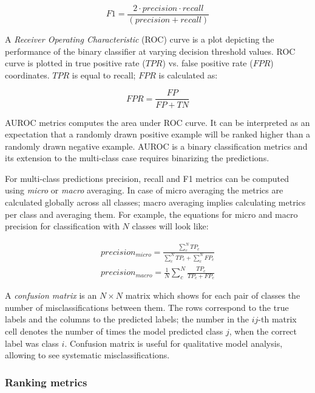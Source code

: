 \begin{equation}
    F1 = \frac{2 \cdot precision \cdot recall}{(precision + recall)}
\end{equation}

 A \textit{Receiver Operating Characteristic} (ROC) curve is a plot depicting the performance of the binary classifier at varying decision threshold values. ROC curve is plotted in true positive rate ($TPR$) vs. false positive rate ($FPR$) coordinates. $TPR$ is equal to recall; $FPR$ is calculated as:

\begin{equation}
    FPR = \frac{FP}{FP + TN}
\end{equation}

AUROC metrics computes the area under ROC curve. It can be interpreted as an expectation that a randomly drawn positive example will be ranked higher than a randomly drawn negative example. AUROC is a binary classification metrics and its extension to the multi-class case requires binarizing the predictions.

 For multi-class predictions precision, recall and F1 metrics can be computed using \textit{micro} or \textit{macro} averaging. In case of micro averaging the metrics are calculated globally across all classes; macro averaging implies calculating metrics per class and averaging them. For example, the equations for micro and macro precision for classification with $N$ classes will look like:

\begin{align}
    precision_{micro} = \frac{\sum_{c}^N TP_c}{\sum_{c}^N TP_c + \sum_{c}^N FP_c} \\
    precision_{macro} = \frac{1}{N}\sum_{c}^N \frac{TP_c}{TP_c + FP_c}
\end{align}

A \textit{confusion matrix} is an $N\times N$ matrix which shows for each pair of classes the number of misclassifications between them. The rows correspond to the true labels and the columns to the predicted labels; the number in the $ij$-th matrix cell denotes the number of times the model predicted class $j$, when the correct label was class $i$. Confusion matrix is useful for qualitative model analysis, allowing to see systematic misclassifications.

\subsubsection{Ranking metrics}

